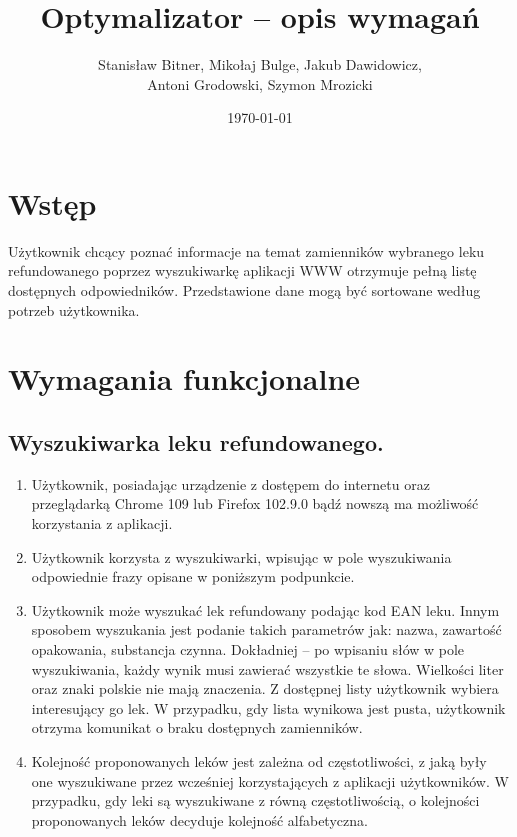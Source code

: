 \documentclass[12pt]{article}
\title{Optymalizator -- opis wymagań}
\author{Stanisław Bitner, Mikołaj Bulge, Jakub Dawidowicz,\\Antoni Grodowski, Szymon Mrozicki}
\date{\today}
\begin{document}
\maketitle

\section{Wstęp}

Użytkownik chcący poznać informacje na temat zamienników wybranego leku
refundowanego poprzez wyszukiwarkę aplikacji WWW otrzymuje pełną listę
dostępnych odpowiedników. Przedstawione dane mogą być  sortowane według potrzeb
użytkownika.

\section{Wymagania funkcjonalne}

\subsection{Wyszukiwarka leku refundowanego.}

\begin{enumerate}
    \item Użytkownik, posiadając urządzenie z dostępem do internetu oraz
      przeglądarką Chrome 109 lub Firefox 102.9.0 bądź nowszą ma możliwość
      korzystania z aplikacji.
    \item Użytkownik korzysta z wyszukiwarki, wpisując w pole wyszukiwania
      odpowiednie frazy opisane w poniższym podpunkcie.
    \item Użytkownik może wyszukać lek refundowany podając kod EAN leku. Innym
      sposobem wyszukania jest podanie takich parametrów jak: nazwa, zawartość
      opakowania, substancja czynna. Dokładniej -- po wpisaniu słów w pole
      wyszukiwania, każdy wynik musi zawierać wszystkie te słowa. Wielkości
      liter oraz znaki polskie nie mają znaczenia. Z dostępnej listy użytkownik
      wybiera interesujący go lek. W przypadku, gdy lista wynikowa jest pusta,
      użytkownik otrzyma komunikat o braku dostępnych zamienników.
    \item Kolejność proponowanych leków jest zależna od częstotliwości, z jaką
      były one wyszukiwane przez wcześniej korzystających z aplikacji
      użytkowników. W przypadku, gdy leki są wyszukiwane z równą
      częstotliwością, o kolejności proponowanych leków decyduje kolejność
      alfabetyczna.
    
\end{enumerate}
\end{document}
